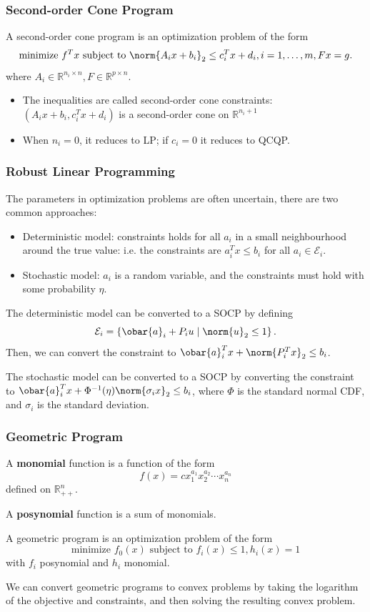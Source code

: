\documentclass[11pt]{article}
\begin{document}
\subsubsection*{Second-order Cone Program}
A second-order cone program is an optimization problem of the form
\[ \text{minimize } f^Tx \text{ subject to } \norm{A_ix + b_i}_2 \leq c_i^Tx + d_i, i = 1, \ldots, m, Fx = g. \] 
where $A_i \in \mathbb{R}^{n_i \times n}, F \in \mathbb{R}^{p \times n}$. \par 
\begin{itemize}
    \item The inequalities are called second-order cone constraints: $(A_ix + b_i, c_i^Tx + d_i)$ is a second-order cone on $\mathbb{R}^{n_i+1}$
    \item When $n_i = 0$, it reduces to LP; if $c_i = 0$ it reduces to QCQP. 
\end{itemize}

\subsubsection*{Robust Linear Programming}
The parameters in optimization problems are often uncertain, there are two common approaches: 
\begin{itemize}
    \item Deterministic model: constraints holds for all $a_i$ in a small neighbourhood around the true value: i.e. the constraints are $a_i^Tx \leq b_i$ for all $a_i \in \mathcal{E}_i$. 
    \item Stochastic model: $a_i$ is a random variable, and the constraints must hold with some probability $\eta$. 
\end{itemize} 

The deterministic model can be converted to a SOCP by defining 
\[ \mathcal{E}_i = \left\{ \obar{a}_i + P_iu \mid \norm{u}_2 \leq 1 \right\}. \] 
Then, we can convert the constraint to $\obar{a}_i^Tx + \norm{P_i^Tx}_2 \leq b_i$. \par 

The stochastic model can be converted to a SOCP by converting the constraint to $\obar{a}_i^Tx + \Phi^{-1}(\eta)\norm{\sigma_ix}_2 \leq b_i$, where $\Phi$ is the standard normal CDF, and $\sigma_i$ is the standard deviation. 

\subsubsection*{Geometric Program}
A \textbf{monomial} function is a function of the form 
\[ f(x) = cx_1^{a_1}x_2^{a_2}\cdots x_n^{a_n} \] 
defined on $\mathbb{R}^n_{++}$. \par
A \textbf{posynomial} function is a sum of monomials. \par 
A geometric program is an optimization problem of the form 
\[ \text{minimize } f_0(x) \text{ subject to } f_i(x) \leq 1, h_i(x) = 1 \] 
with $f_i$ posynomial and $h_i$ monomial. \par 
We can convert geometric programs to convex problems by taking the logarithm of the objective and constraints, and then solving the resulting convex problem.
\end{document}
